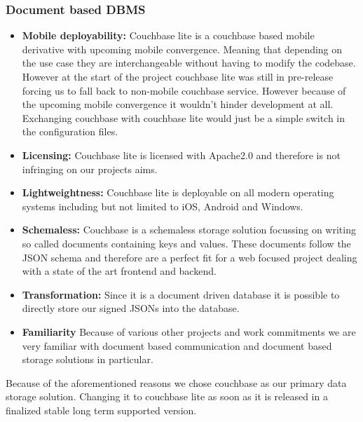 \subsubsection{Document based DBMS}
\label{databaseDBMS}
\begin{itemize}
\item \label{doc_req_one} \textbf{Mobile deployability:}
Couchbase lite is a couchbase based mobile derivative with upcoming mobile convergence.
Meaning that depending on the use case they are interchangeable without having to modify the codebase.
However at the start of the project couchbase lite was still in pre-release forcing us to fall back to non-mobile
couchbase service. However because of the upcoming mobile convergence it wouldn't hinder development at all.
Exchanging couchbase with couchbase lite would just be a simple switch in the configuration files.
\item \label{doc_req_two} \textbf{Licensing:}
Couchbase lite is licensed with Apache2.0 and therefore is not infringing on our projects aims.
\item \label{doc_item_three} \textbf{Lightweightness:}
Couchbase lite is deployable on all modern operating systems including but not limited to iOS, Android and Windows.
\item \label{doc_req_four} \textbf{Schemaless:}
Couchbase is a schemaless storage solution focussing on writing so called documents containing keys and values.
These documents follow the JSON schema and therefore are a perfect fit for a web focused project dealing with a state
of the art frontend and backend.
\item \label{doc_req_five} \textbf{Transformation:}
Since it is a document driven database it is possible to directly store our signed JSONs into the database.
\item \label{doc_req_six} \textbf{Familiarity}
Because of various other projects and work commitments we are very familiar with document based communication and
document based storage solutions in particular.
\end{itemize}
Because of the aforementioned reasons we chose couchbase as our primary data storage solution. Changing it to couchbase
lite as soon as it is released in a finalized stable long term supported version.

